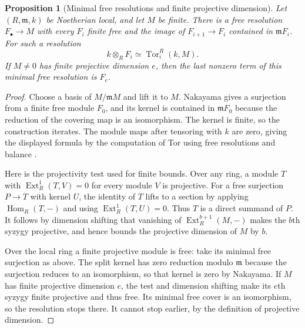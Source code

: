 \documentclass[11pt,oneside,openany]{book}
\newtheorem{proposition}[theorem]{Proposition}
\theoremstyle{definition}
\theoremstyle{remark}
\begin{document}
\begin{proposition}[Minimal free resolutions and finite projective dimension]
\label{res:DP-12}
Let $(R,\mathfrak m,k)$ be Noetherian local, and let $M$ be finite.
There is a free resolution $F_\bullet\to M$ with every $F_i$ finite
free and the image of $F_{i+1}\to F_i$ contained in $\mathfrak m F_i$.
For such a resolution
\[
 k\otimes_R F_i\simeq \operatorname{Tor}^R_i(k,M).
\]
If $M\ne0$ has finite projective dimension $e$, then the last nonzero
term of this minimal free resolution is $F_e$.
\end{proposition}
\begin{proof}
Choose a basis of $M/\mathfrak mM$ and lift it to $M$.
Nakayama gives a surjection from a finite free module $F_0$,
and its kernel is contained in $\mathfrak mF_0$ because the reduction
of the covering map is an isomorphism. The kernel is finite, so the
construction iterates. The module maps after tensoring with $k$ are
zero, giving the displayed formula by the computation of Tor using
free resolutions and balance
\cite[Results ALG-10-C03-R01 and ALG-10-C03-S01]{p103}.

Here is the projectivity test used for finite bounds. Over any ring,
a module $T$ with $\operatorname{Ext}_R^1(T,V)=0$ for every module
$V$ is projective. For a free surjection $P\to T$ with kernel $U$,
the identity of $T$ lifts to a section by applying
$\operatorname{Hom}_R(T,-)$ and using
$\operatorname{Ext}_R^1(T,U)=0$. Thus $T$ is a direct summand of $P$.
It follows by dimension shifting that vanishing of
$\operatorname{Ext}_R^{b+1}(M,-)$ makes the $b$th syzygy projective,
and hence bounds the projective dimension of $M$ by $b$.

Over the local ring a finite projective module is free: take its
minimal free surjection as above. The split kernel has zero reduction
modulo $\mathfrak m$ because the surjection reduces to an isomorphism,
so that kernel is zero by Nakayama. If $M$ has finite projective
dimension $e$, the test and dimension shifting make its $e$th syzygy
finite projective and thus free. Its minimal free cover is an
isomorphism, so the resolution stops there. It cannot stop earlier,
by the definition of projective dimension.
\end{proof}
\end{document}
